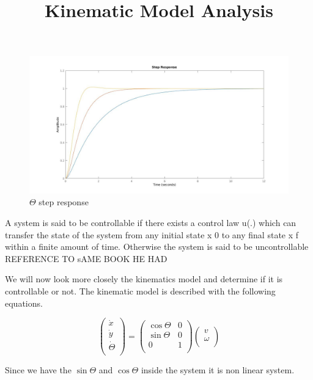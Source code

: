 \begin{figure} 
\centering
 	\includegraphics[width=1\textwidth]{figures/thetastep.jpg}
	
	
	\caption{$\Theta$ step response} 
 	\label{fig:thetastep} 
\end{figure}

\title{Kinematic Model Analysis}

A system is said to be controllable if there exists a control law u(.) which can
transfer the state of the system from any initial state x 0 to any final state x f within
a finite amount of time. Otherwise the system is said to be uncontrollable {\color{red} REFERENCE TO sAME BOOK HE HAD}

We will now look more closely the kinematics model and determine if it is controllable or not. The kinematic model is described with the following equations.

\begin{equation} \label{eq74}
\begin{pmatrix} 
 \dot{x} \\ 
 \dot{y} \\
 \dot{\Theta}\\
 \end{pmatrix} 
 =
 \begin{pmatrix}  
 \cos\Theta   & 0 \\ 
 \sin\Theta & 0 \\
 0 & 1\\ 
 \end{pmatrix}
 \begin{pmatrix} 
 v \\ 
 \omega\\
 \end{pmatrix} 
\end{equation}

Since we have the $\sin\Theta$ and $\cos\Theta$ inside the system it is non linear system.

